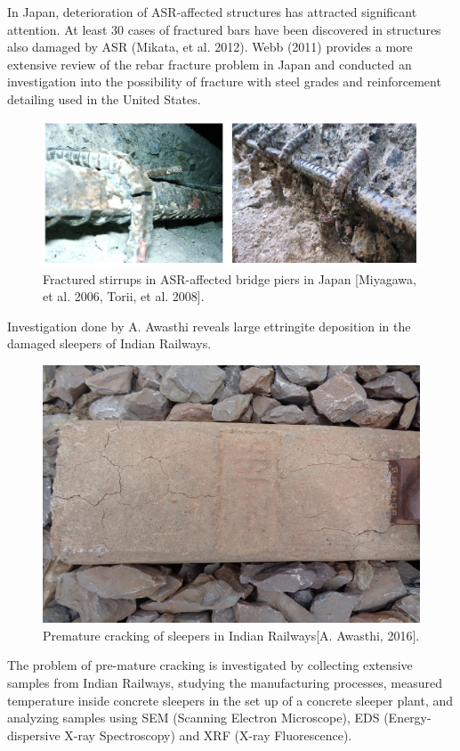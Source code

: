 
In Japan, deterioration of ASR-affected structures  has attracted significant attention. At least 30 cases of fractured bars have been discovered in structures also damaged by ASR (Mikata, et al. 2012). Webb (2011) provides a more extensive review of the rebar fracture problem in Japan and conducted an investigation into the possibility of fracture with steel grades and reinforcement detailing used in the United States.

    \begin{figure}[ht!]
        \centering
        \includegraphics[width=.9\linewidth]{Files/Background/Miyagawa.png}
        \caption{Fractured stirrups in ASR-affected bridge piers in Japan [Miyagawa, et al. 2006, Torii, et al. 2008].}
        \label{fig:Miyagawa}
    \end{figure}



Investigation done by A. Awasthi reveals large ettringite deposition in the damaged sleepers of Indian Railways.

    \begin{figure}[ht!]
        \centering
        \includegraphics[width=.4\linewidth]{Files/Background/Anupam_1.png}
        \caption{Premature cracking of sleepers in Indian Railways[A. Awasthi, 2016].}
        \label{fig:Awasthi_1}
    \end{figure}

The problem of pre-mature cracking is investigated by collecting extensive samples from Indian Railways, studying the manufacturing processes, measured temperature inside concrete sleepers in the set up of a concrete sleeper plant, and analyzing samples using SEM (Scanning Electron Microscope), EDS (Energy-dispersive X-ray Spectroscopy) and XRF (X-ray Fluorescence).

